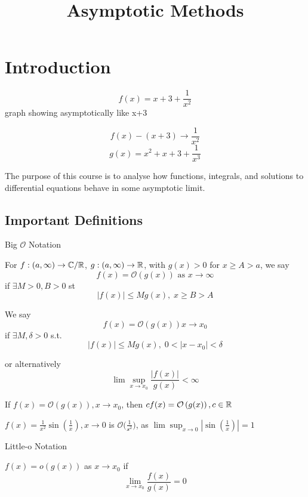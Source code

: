 \documentclass[a4paper]{article}
\title{Asymptotic Methods}
\author{}
\begin{document}
	
\maketitle

\section{Introduction}
	
	 \[
		 f(x) = x + 3 + \frac{1}{x^2}
	 \]
	 graph showing asymptotically like x+3

	 \[
		 f(x) - (x+3) \to \frac{1}{x^2}
	 \]
	 \[
		 g(x) = x^2 + x + 3 + \frac{1}{x^{3}}
	 \] 

	 The purpose of this course is to analyse how functions, integrals, and solutions to differential equations behave in some asymptotic limit.


\subsection{Important Definitions}

\begin{defn} Big $\mathcal{O}$ Notation

	For $f: (a, \infty) \to \mathbb{C} / \mathbb{R}$, $g: (a,\infty) \to \mathbb{R}$, with $g(x)>0$ for  $x\ge A > a$, we say
	\[
		f(x) = \mathcal{O}\left( g(x) \right)  \text{ as } x\to \infty
	\]
	if $\exists M > 0, B>0 $  st
	\[
		|f(x)| \le Mg(x), \; x\ge B>A
	\] 
	

	We say
	\[
		f(x) =  \mathcal{O}\left( g(x) \right) x\to x_0
	\]
	if $\exists M, \delta > 0$ s.t.
	\[
		|f(x)| \le M g(x), \; 0 < |x-x_0| < \delta
	\]

	or alternatively
	\[
		\lim \sup_{x\to x_0} \frac{|f(x)|}{g(x)} < \infty
	\] 
\end{defn}

\begin{observation}
	If $f(x) = \mathcal{O}\left( g(x)  \right), x\to x_0$, then $ cf(x) =  \mathcal{O}\left( g(x) \right), c \in \mathbb{R} $
\end{observation}

\begin{eg}
	$f(x) = \frac{1}{x^2}\sin(\frac{1}{x}), x\to 0$ is $\mathcal{O(\frac{1}{x^2}})$, as $\lim\sup_{x\to 0} |\sin(\frac{1}{x})| = 1$
\end{eg}


\begin{defn} Little-o Notation
	
	$f(x) = o\left( g(x) \right)$ as $x\to x_0$ if
	\[
		\lim_{x\to x_0} \frac{f(x)}{g(x)} = 0
	\] 

\end{defn}
\end{document}
